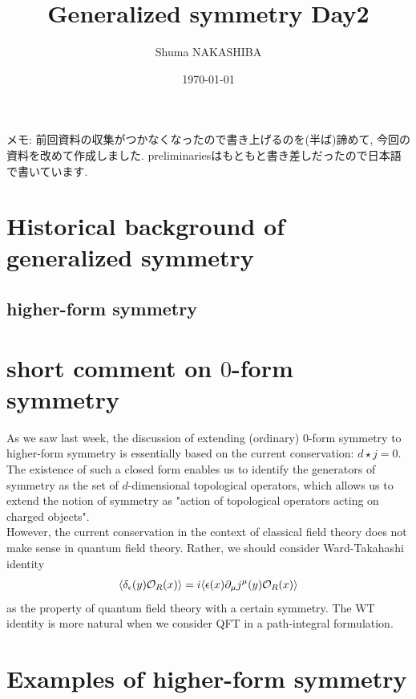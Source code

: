 \documentclass{ltjsarticle}
\title{Generalized symmetry Day2}
\author{Shuma NAKASHIBA}
\date{\today}
\theoremstyle{mystyle} %
\numberwithin{equation}{section}
\begin{document}
\maketitle

\setcounter{tocdepth}{2}
\tableofcontents
\newpage
\noindent
\small
メモ: 前回資料の収集がつかなくなったので書き上げるのを(半ば)諦めて, 今回の資料を改めて作成しました. 
preliminariesはもともと書き差しだったので日本語で書いています. 
\normalsize
\section{Historical background of generalized symmetry}
\subsection{higher-form symmetry}
\section{short comment on $0$-form symmetry}
As we saw last week, the discussion of extending (ordinary) $0$-form symmetry to higher-form symmetry is 
essentially based on the current conservation: $d\star j=0$. 
The existence of such a closed form enables us to identify the generators of symmetry as the set of $d$-dimensional topological operators, 
which allows us to extend the notion of symmetry as "action of topological operators acting on charged objects". \\
 However, the current conservation in the context of classical field theory does not make sense in quantum field theory. 
 Rather, we should consider Ward-Takahashi identity
 \begin{align}
    \langle{\delta_\epsilon(y)\mathcal{O}_R(x)}\rangle=i\langle{\epsilon(x)\partial_\mu j^\mu(y)\mathcal{O}_R(x)}\rangle
 \end{align}
as the property of quantum field theory with a certain symmetry. 
The WT identity is more natural when we consider QFT in a path-integral formulation. 
\section{Examples of higher-form symmetry}
\end{document}
